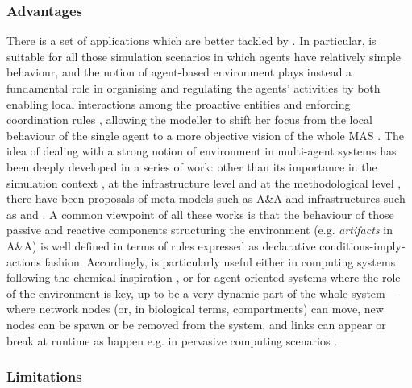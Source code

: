 \documentclass[12pt,a4paper,twoside,openright]{book}
\begin{document}
\subsubsection{Advantages}

There is a set of applications which are better tackled by \alchemist{}.
%
In particular, \alchemist{} is suitable for all those simulation scenarios in which agents have relatively simple behaviour, and the notion of agent-based environment plays instead a fundamental role in organising and regulating the agents' activities \cite{BandiniE4MAS2006} by both enabling local interactions among the proactive entities \cite{HellebooghAAMAS2007} and enforcing coordination rules \cite{aose-mags5}, allowing the modeller to shift her focus from the local behaviour of the single agent to a more objective vision of the whole MAS \cite{SchumacherCEEMAS2007}. 
%
The idea of dealing with a strong notion of environment in multi-agent systems has been deeply developed in a series of work: other than its importance in the simulation context \cite{HellebooghAAMAS2007}, at the infrastructure level \cite{VHRSZ-JAAMAS2007} and at the methodological level \cite{aose-mags5}, there have been proposals of meta-models such as A\&A \cite{artifacts-jaamas17} and infrastructures such as \tucson{} \cite{tucson-aamas99} and \cartago{} \cite{RPV-JAAMAS2011}.
%
A common viewpoint of all these works is that the behaviour of those passive and reactive components structuring the environment (e.g. \emph{artifacts} in A\&A) is well defined in terms of rules expressed as declarative conditions-imply-actions fashion.
%
Accordingly, \alchemist{} is particularly useful either in computing systems following the chemical inspiration \cite{VCMZ-TAAS2011,VZ-INS2010,sapere-procedia7}, or for agent-oriented systems where the role of the environment is key, up to be a very dynamic part of the whole system---where network nodes (or, in biological terms, compartments) can move, new nodes can be spawn or be removed from the system, and links can appear or break at runtime as happen e.g. in pervasive computing scenarios \cite{sapere-procedia7}.

\subsubsection{Limitations}
\end{document}
